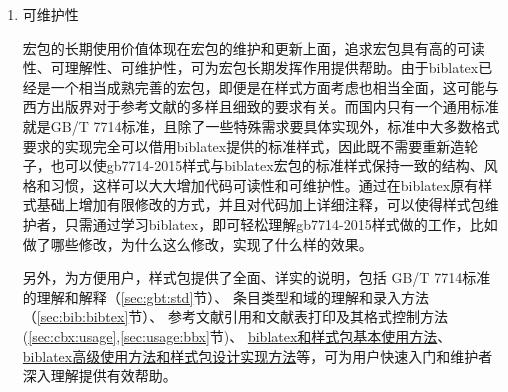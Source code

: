 \documentclass[11pt]{article} %
\begin{document}
\begin{enumerate}
  \item 可维护性

宏包的长期使用价值体现在宏包的维护和更新上面，追求宏包具有高的可读性、可理解性、可维护性，可为宏包长期发挥作用提供帮助。由于biblatex已经是一个相当成熟完善的宏包，即便是在样式方面考虑也相当全面，这可能与西方出版界对于参考文献的多样且细致的要求有关。而国内只有一个通用标准就是GB/T 7714标准，且除了一些特殊需求要具体实现外，标准中大多数格式要求的实现完全可以借用biblatex提供的标准样式，因此既不需要重新造轮子，也可以使gb7714-2015样式与biblatex宏包的标准样式保持一致的结构、风格和习惯，这样可以大大增加代码可读性和可维护性。通过在biblatex原有样式基础上增加有限修改的方式，并且对代码加上详细注释，可以使得样式包维护者，只需通过学习biblatex，即可轻松理解gb7714-2015样式做的工作，比如做了哪些修改，为什么这么修改，实现了什么样的效果。


另外，为方便用户，样式包提供了全面、详实的说明，包括
GB/T 7714标准的理解和解释（\ref{sec:gbt:std}节）、
条目类型和域的理解和录入方法（\ref{sec:bib:bibtex}节）、
参考文献引用和文献表打印及其格式控制方法(\ref{sec:cbx:usage},\ref{sec:usage:bbx}节)、
\href{https://github.com/hushidong/biblatex-gb7714-2015/wiki}{biblatex和样式包基本使用方法}、
\href{https://github.com/hushidong/biblatex-solution-to-latex-bibliography/blob/master/biblatex-solution-to-latex-bibliography.pdf}%
{biblatex高级使用方法和样式包设计实现方法}等，可为用户快速入门和维护者深入理解提供有效帮助。

\end{enumerate}

\end{document}
